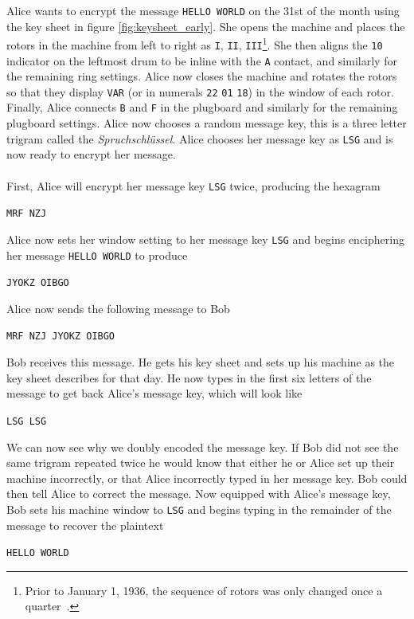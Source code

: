 \noindent Alice wants to encrypt the message \texttt{HELLO WORLD} on
the 31st of the month using the key sheet in figure
\ref{fig:keysheet_early}. She opens the machine and places the rotors in
the machine from left to right as \texttt{I}, \texttt{II},
\texttt{III}\footnote{Prior to January 1, 1936, the sequence of
rotors was only changed once a quarter~\cite[p.~223]{Rejewski1980}.}. She then aligns the
\texttt{10} indicator on the
leftmost drum to be inline with the \texttt{A} contact, and similarly
for the remaining ring settings. Alice now closes the machine and
rotates the rotors so that they display \texttt{VAR} (or in numerals
\texttt{22} \texttt{01} \texttt{18}) in the window of
each rotor. Finally, Alice connects \texttt{B} and \texttt{F} in the
plugboard and similarly for the remaining plugboard settings. Alice
now chooses a random message key, this is a three letter trigram
called the \emph{Spruchschlüssel}. Alice chooses her message key as
\texttt{LSG} and is now ready to encrypt her message.
\\\\First, Alice will encrypt her message key \texttt{LSG} twice,
producing the hexagram
\begin{center}
  \texttt{MRF NZJ}
\end{center}
\noindent Alice now sets her window setting to her message key
\texttt{LSG} and begins enciphering her message \texttt{HELLO WORLD} to produce
\begin{center}
  \texttt{JYOKZ OIBGO}
\end{center}
Alice now sends the following message to Bob
\begin{center}
  \texttt{MRF NZJ JYOKZ OIBGO}
\end{center}
\noindent Bob receives this message. He gets his key sheet and sets
up his machine as the key sheet describes for that day. He now types
in the first six letters of the message to get back Alice's message
key, which will look like
\begin{center}
  \texttt{LSG LSG}
\end{center}
We can now see why we doubly encoded the message key. If Bob did not
see the same trigram repeated twice he would know that either he or
Alice set up their machine incorrectly, or that Alice incorrectly typed in
her message key. Bob could then tell Alice to correct the message.
Now equipped with Alice's message key, Bob sets his machine window to
\texttt{LSG} and begins typing in the remainder of the message to
recover the plaintext
\begin{center}
  \texttt{HELLO WORLD}
\end{center}
